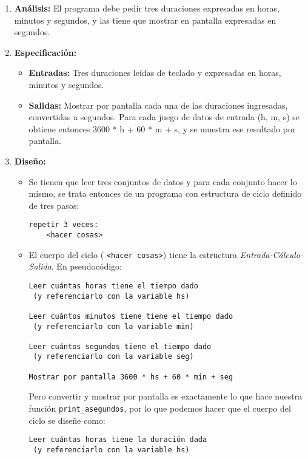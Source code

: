 \begin{enumerate}

\item {\bf Análisis: } El programa debe pedir tres duraciones expresadas en
horas, minutos y segundos, y las tiene que mostrar en pantalla expresadas en
segundos.

\item {\bf Especificación: }
\begin{itemize}
\item {\bf Entradas: } Tres duraciones leídas de teclado y expresadas en horas,
minutos y segundos.
\item {\bf Salidas: } Mostrar por pantalla cada una de las duraciones
ingresadas, convertidas a segundos.  Para cada juego de datos de entrada (h, m,
s) se obtiene entonces 3600 * h + 60 * m + s, y se muestra ese resultado por
pantalla.
\end{itemize}
\item {\bf Diseño:}
\begin{itemize}
\item Se tienen que leer tres conjuntos de datos y para cada conjunto hacer lo
mismo, se trata entonces de un programa con estructura de ciclo definido de
tres pasos:

\begin{verbatim}
repetir 3 veces:
    <hacer cosas>
\end{verbatim}

\item El cuerpo del ciclo ( \verb+<hacer cosas>+)  tiene la estructura {\it
Entrada-Cálculo-Salida}.  En pseudocódigo:

\begin{verbatim}
Leer cuántas horas tiene el tiempo dado
 (y referenciarlo con la variable hs)

Leer cuántos minutos tiene tiene el tiempo dado
 (y referenciarlo con la variable min)

Leer cuántos segundos tiene el tiempo dado
 (y referenciarlo con la variable seg)

Mostrar por pantalla 3600 * hs + 60 * min + seg
\end{verbatim}

Pero convertir y mostrar por pantalla es exactamente lo que
hace nuestra función \verb+print_asegundos+, por lo que podemos
hacer que el cuerpo del ciclo se diseñe como:

\begin{verbatim}
Leer cuántas horas tiene la duración dada
 (y referenciarlo con la variable hs)


\end{verbatim}
\end{itemize}
\end{enumerate}
